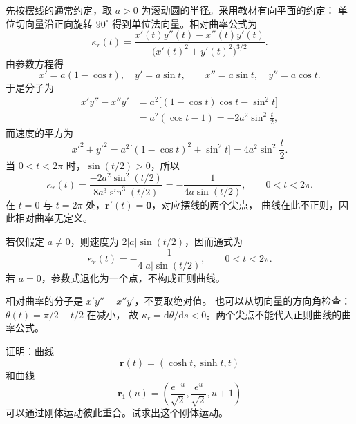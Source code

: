 \begin{solution}
先按摆线的通常约定，取 $a>0$ 为滚动圆的半径。采用教材有向平面的约定：
单位切向量沿正向旋转 $90^\circ$ 得到单位法向量。相对曲率公式为
\[
\kappa_r(t)=\frac{x'(t)y''(t)-x''(t)y'(t)}
{\bigl(x'(t)^2+y'(t)^2\bigr)^{3/2}}.
\]
由参数方程得
\[
x'=a(1-\cos t),\quad y'=a\sin t,\qquad
x''=a\sin t,\quad y''=a\cos t.
\]
于是分子为
\begin{align*}
x'y''-x''y'
&=a^2\bigl[(1-\cos t)\cos t-\sin^2t\bigr]\\
&=a^2(\cos t-1)=-2a^2\sin^2\frac t2,
\end{align*}
而速度的平方为
\[
x'^2+y'^2=a^2\bigl[(1-\cos t)^2+\sin^2t\bigr]
=4a^2\sin^2\frac t2.
\]
当 $0<t<2\pi$ 时，$\sin(t/2)>0$，所以
\[
\kappa_r(t)=\frac{-2a^2\sin^2(t/2)}{8a^3\sin^3(t/2)}
=\boxed{-\frac1{4a\sin(t/2)}},\qquad 0<t<2\pi.
\]
在 $t=0$ 与 $t=2\pi$ 处，$\bm r'(t)=\bm0$，对应摆线的两个尖点，
曲线在此不正则，因此相对曲率无定义。

若仅假定 $a\neq0$，则速度为 $2|a|\sin(t/2)$，因而通式为
\[
\boxed{\kappa_r(t)=-\frac1{4|a|\sin(t/2)}},\qquad 0<t<2\pi.
\]
若 $a=0$，参数式退化为一个点，不构成正则曲线。
\end{solution}

\begin{dxtips}[相对曲率保留正负号]\label{hw:curves:tip5}
相对曲率的分子是 $x'y''-x''y'$，不要取绝对值。
也可以从切向量的方向角检查：$\theta(t)=\pi/2-t/2$ 在减小，
故 $\kappa_r=\mathrm d\theta/\mathrm ds<0$。两个尖点不能代入正则曲线的曲率公式。
\end{dxtips}

\clearpage
\begin{homework}[教材第52页，习题2.5，第5题]
\par\smallskip
证明：曲线
\[
\bm r(t)=(\cosh t,\sinh t,t)
\]
和曲线
\[
\bm r_1(u)=\left(\frac{e^{-u}}{\sqrt2},\frac{e^u}{\sqrt2},u+1\right)
\]
可以通过刚体运动彼此重合。试求出这个刚体运动。
\end{homework}

